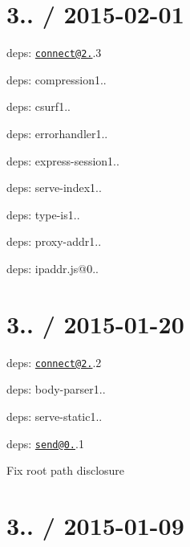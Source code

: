 {\ttfamily \section*{3.. / 2015-\/02-\/01 }}

{\ttfamily }

{\ttfamily 
\begin{DoxyItemize}
\item deps\+: \href{mailto:connect@2.28}{\tt connect@2.}.3
\begin{DoxyItemize}
\item deps\+: compression1..
\item deps\+: csurf1..
\item deps\+: errorhandler1..
\item deps\+: express-\/session1..
\item deps\+: serve-\/index1..
\item deps\+: type-\/is1..
\end{DoxyItemize}
\item deps\+: proxy-\/addr1..
\begin{DoxyItemize}
\item deps\+: ipaddr.\+js@0..
\end{DoxyItemize}
\end{DoxyItemize}}

{\ttfamily \section*{3.. / 2015-\/01-\/20 }}

{\ttfamily }

{\ttfamily 
\begin{DoxyItemize}
\item deps\+: \href{mailto:connect@2.28}{\tt connect@2.}.2
\begin{DoxyItemize}
\item deps\+: body-\/parser1..
\item deps\+: serve-\/static1..
\end{DoxyItemize}
\item deps\+: \href{mailto:send@0.11}{\tt send@0.}.1
\begin{DoxyItemize}
\item Fix root path disclosure
\end{DoxyItemize}
\end{DoxyItemize}}

{\ttfamily \section*{3.. / 2015-\/01-\/09 }}

